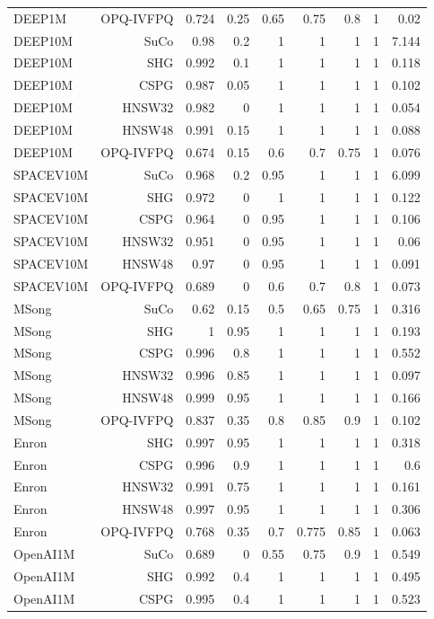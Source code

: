 \begin{table}[t]
\begin{tabular}{lrrrrrrrr}
DEEP1M & OPQ-IVFPQ & 0.724 & 0.25 & 0.65 & 0.75 & 0.8 & 1 & 0.02 \\
DEEP10M & SuCo & 0.98 & 0.2 & 1 & 1 & 1 & 1 & 7.144 \\
DEEP10M & SHG & 0.992 & 0.1 & 1 & 1 & 1 & 1 & 0.118 \\
DEEP10M & CSPG & 0.987 & 0.05 & 1 & 1 & 1 & 1 & 0.102 \\
DEEP10M & HNSW32 & 0.982 & 0 & 1 & 1 & 1 & 1 & 0.054 \\
DEEP10M & HNSW48 & 0.991 & 0.15 & 1 & 1 & 1 & 1 & 0.088 \\
DEEP10M & OPQ-IVFPQ & 0.674 & 0.15 & 0.6 & 0.7 & 0.75 & 1 & 0.076 \\
SPACEV10M & SuCo & 0.968 & 0.2 & 0.95 & 1 & 1 & 1 & 6.099 \\
SPACEV10M & SHG & 0.972 & 0 & 1 & 1 & 1 & 1 & 0.122 \\
SPACEV10M & CSPG & 0.964 & 0 & 0.95 & 1 & 1 & 1 & 0.106 \\
SPACEV10M & HNSW32 & 0.951 & 0 & 0.95 & 1 & 1 & 1 & 0.06 \\
SPACEV10M & HNSW48 & 0.97 & 0 & 0.95 & 1 & 1 & 1 & 0.091 \\
SPACEV10M & OPQ-IVFPQ & 0.689 & 0 & 0.6 & 0.7 & 0.8 & 1 & 0.073 \\
MSong & SuCo & 0.62 & 0.15 & 0.5 & 0.65 & 0.75 & 1 & 0.316 \\
MSong & SHG & 1 & 0.95 & 1 & 1 & 1 & 1 & 0.193 \\
MSong & CSPG & 0.996 & 0.8 & 1 & 1 & 1 & 1 & 0.552 \\
MSong & HNSW32 & 0.996 & 0.85 & 1 & 1 & 1 & 1 & 0.097 \\
MSong & HNSW48 & 0.999 & 0.95 & 1 & 1 & 1 & 1 & 0.166 \\
MSong & OPQ-IVFPQ & 0.837 & 0.35 & 0.8 & 0.85 & 0.9 & 1 & 0.102 \\
Enron & SHG & 0.997 & 0.95 & 1 & 1 & 1 & 1 & 0.318 \\
Enron & CSPG & 0.996 & 0.9 & 1 & 1 & 1 & 1 & 0.6 \\
Enron & HNSW32 & 0.991 & 0.75 & 1 & 1 & 1 & 1 & 0.161 \\
Enron & HNSW48 & 0.997 & 0.95 & 1 & 1 & 1 & 1 & 0.306 \\
Enron & OPQ-IVFPQ & 0.768 & 0.35 & 0.7 & 0.775 & 0.85 & 1 & 0.063 \\
OpenAI1M & SuCo & 0.689 & 0 & 0.55 & 0.75 & 0.9 & 1 & 0.549 \\
OpenAI1M & SHG & 0.992 & 0.4 & 1 & 1 & 1 & 1 & 0.495 \\
OpenAI1M & CSPG & 0.995 & 0.4 & 1 & 1 & 1 & 1 & 0.523 \\

\end{tabular}
\end{table}
